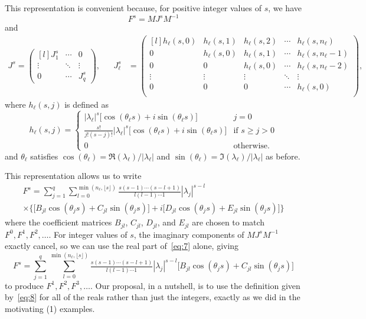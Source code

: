 \documentclass[12pt,fleqn]{article}
\begin{document}
This representation is convenient because, for positive integer values
of $s$, we have
\[
F^s = M J^s M^{-1}
\]
and
\begin{align*}
J^s =
\begin{pmatrix*}[l]
  J_1^s  & \cdots & 0      \\
  \vdots & \ddots & \vdots \\
  0      & \cdots & J_q^s
\end{pmatrix*}, &&
J_\ell^s &=
\begin{pmatrix*}[l]
  h_\ell(s,0) & h_\ell(s,1) & h_\ell(s,2) & \cdots & h_\ell(s,n_\ell)   \\
  0           & h_\ell(s,0) & h_\ell(s,1) & \cdots & h_\ell(s,n_\ell-1) \\
  0           & 0           & h_\ell(s,0) & \cdots & h_\ell(s,n_\ell-2) \\
  \vdots      & \vdots      & \vdots      & \ddots & \vdots             \\
  0           & 0           & 0           & \cdots & h_\ell(s,0)        \\
\end{pmatrix*},
\end{align*}
  where $h_\ell(s,j)$ is defined as
\begin{equation*}
h_\ell(s,j) =
\begin{cases}
  |\lambda_\ell|^s \big[\cos(\theta_\ell s) + i \sin(\theta_\ell s)\big] & j = 0 \\
  \frac{s!}{j!(s-j)!} |\lambda_\ell|^s \big[\cos(\theta_\ell s) + i \sin(\theta_\ell s)\big] & \text{if } s \geq j > 0 \\
  0 & \text{otherwise.}
\end{cases}
\end{equation*}
and $\theta_\ell$ satisfies
$\cos(\theta_\ell) = \Re(\lambda_\ell)/|\lambda_\ell|$ and
$\sin(\theta_\ell) = \Im(\lambda_\ell)/|\lambda_\ell|$ as before.

This representation allows us to write
\begin{multline}
  \label{eq:7}
  F^s =
  \sum_{j = 1}^q \sum_{l=0}^{\min(n_\ell, \lfloor s\rfloor)} \tfrac{s(s-1)\cdots(s-l+1)}{l (l - 1) \cdots 1} |\lambda_j|^{s-l} \\
  \times\Big\{\big[B_{jl} \cos(\theta_j s) + C_{jl} \sin(\theta_j s)\big] + i\big[D_{jl} \cos(\theta_j s) + E_{jl} \sin(\theta_j s)\big]\Big\}
\end{multline}
where the coefficient matrices $B_{jl}$, $C_{jl}$, $D_{jl}$, and
$E_{jl}$ are chosen to match $F^0, F^1, F^2,\dots$. For integer
values of $s$, the imaginary components of $M J^s M^{-1}$ exactly
cancel, so we can use the real part of~\eqref{eq:7} alone, giving
\begin{equation}
  \label{eq:8}
  F^s =
  \sum_{j = 1}^q \sum_{l=0}^{\min(n_\ell, \lfloor s \rfloor)} \tfrac{s(s-1)\cdots(s-l+1)}{l (l - 1) \cdots 1} |\lambda_j|^{s-l} \big[B_{jl} \cos(\theta_j s) + C_{jl} \sin(\theta_j s)\big]
\end{equation}
to produce $F^1, F^2, F^3,\dots$. Our proposal, in a nutshell, is to
use the definition given by~\eqref{eq:8} for all of the reals rather
than just the integers, exactly as we did in the motivating \AR(1)
examples.
\end{document}
